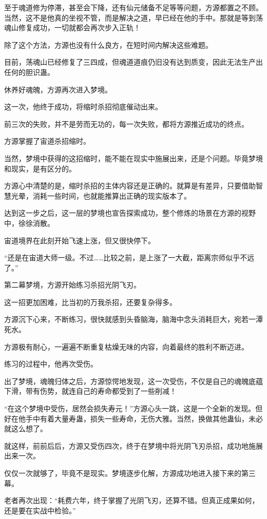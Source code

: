 \begin{this_body}
至于魂道修为停滞，甚至会下降，还有仙元储备不足等等问题，方源都置之不顾。当然，这不是他真的坐视不管，而是解决之道，早已经在他的手中。那就是等到荡魂山修复成功，一切就都会再次步入正轨！

除了这个方法，方源也没有什么良方，在短时间内解决这些难题。

目前，荡魂山已经修复了三四成，但魂道道痕仍旧没有达到质变，因此无法生产出任何的胆识蛊。

休养好魂魄，方源再次进入梦境。

这一次，他终于成功，将缩时杀招彻底催动出来。

前三次的失败，并不是劳而无功的，每一次失败，都将方源推近成功的终点。

方源掌握了宙道杀招缩时。

当然，梦境中获得的这招缩时，能不能在现实中施展出来，还是个问题。毕竟梦境和现实，是有区分的。

方源心中清楚的是，缩时杀招的主体内容还是正确的。就算是有差异，只要借助智慧光晕，消耗一些时间，也就能推算出正确的现实版本了。

达到这一步之后，这一层的梦境也宣告探索成功，整个修炼的场景在方源的视野中，徐徐消散。

宙道境界在此刻开始飞速上涨，但又很快停下。

“还是在宙道大师一级。不过……比较之前，是上涨了一大截，距离宗师似乎不远了。”

第二幕梦境，方源开始练习杀招光阴飞刃。

这一招更加困难，比当初的万我杀招，还要复杂得多。

方源沉下心来，不断练习，很快就感到头昏脑海，脑海中念头消耗巨大，宛若一潭死水。

方源极有耐心，一遍遍不断重复枯燥无味的内容，向着最终的胜利不断迈进。

练习的过程中，他再次受伤。

出了梦境，魂魄归体之后，方源惊愕地发现，这一次受伤，不仅是自己的魂魄底蕴下滑，带有伤势，就连自己的寿命都受到了一些削减！

“在这个梦境中受伤，居然会损失寿元！”方源心头一跳，这是一个全新的发现。但好在他手中有着大量寿蛊，损失一些寿命，无伤大雅。当然，换做其他蛊仙，未必就这么想了。

就这样，前前后后，方源又受伤四次，终于在梦境中将光阴飞刃杀招，成功地施展出来一次。

仅仅一次就够了，毕竟不是现实。梦境逐步化解，方源成功地进入接下来的第三幕。

老者再次出现：“耗费六年，终于掌握了光阴飞刃，还算不错。但真正成果如何，还是要在实战中检验。”


\end{this_body}
